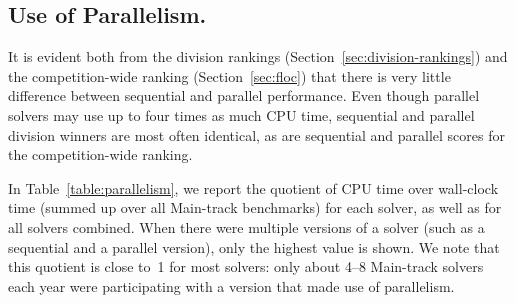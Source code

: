 \documentclass[dvipsnames,table,twoside,11pt]{article}
\begin{document}
\subsection{Use of Parallelism.}

It is evident both from the division rankings
(Section~\ref{sec:division-rankings}) and the competition-wide ranking
(Section~\ref{sec:floc}) that there is very little difference between
sequential and parallel performance.  Even though parallel solvers may
use up to four times as much CPU time, sequential and parallel
division winners are most often identical, as are sequential and
parallel scores for the competition-wide ranking.


In Table~\ref{table:parallelism}, we report the quotient of CPU time
over wall-clock time (summed up over all Main-track benchmarks) for
each solver, as well as for all solvers combined.  When there were
multiple versions of a solver (such as a sequential and a parallel
version), only the highest value is shown.  We note that this quotient
is close to~1 for most solvers: only about 4--8 Main-track solvers
each year were participating with a version that made use of
parallelism.
\end{document}
